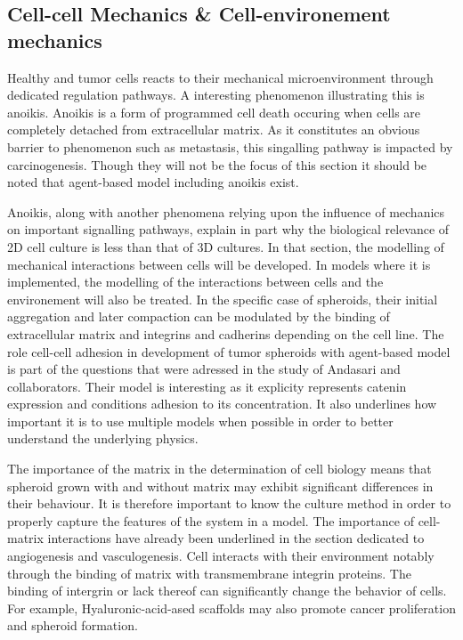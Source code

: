 \documentclass[11pt,a4paper]{article}
\begin{document}
\subsection{Cell-cell Mechanics \& Cell-environement mechanics}
Healthy and tumor cells reacts to their mechanical microenvironment through dedicated regulation pathways. A interesting phenomenon illustrating this is anoikis. Anoikis is a form of programmed cell death occuring when cells are completely detached from extracellular matrix. As it constitutes an obvious barrier to phenomenon such as metastasis, this singalling pathway is impacted by carcinogenesis.\cite{Paoli2013}\cite{Raeisi2022} Though they will not be the focus of this section it should be noted that agent-based model including anoikis exist.\cite{Ingham2017}\cite{Campenni2020}

Anoikis, along with another phenomena relying upon the influence of mechanics on important signalling pathways, explain in part why the biological relevance of 2D cell culture is less than that of 3D cultures. In that section, the modelling of mechanical interactions between cells will be developed. In models where it is implemented, the modelling  of the interactions between cells and the environement will also be treated. In the specific case of spheroids, their initial aggregation and later compaction can be modulated by the binding of extracellular matrix and integrins and cadherins depending on the cell line.\cite{Cui2017} The role cell-cell adhesion in development of tumor spheroids with agent-based model is part of the questions that were  adressed in the study of Andasari and collaborators.\cite{Andasari2012} Their model is interesting as it explicity represents catenin expression and conditions adhesion to its concentration. It also underlines how important it is to use multiple models when possible in order to better understand the underlying physics. 


The importance of the matrix in the determination of cell biology means that spheroid grown with and without matrix may exhibit significant differences in their behaviour. It is therefore important to know the culture method in order to properly capture the features of the system  in a model. The importance of cell-matrix interactions have already been underlined in the section dedicated to angiogenesis and vasculogenesis. Cell interacts with their environment notably through the binding of matrix with transmembrane integrin proteins. The binding of intergrin or lack thereof can significantly change the behavior of cells.\cite{Cui2017} For example, Hyaluronic-acid-ased scaffolds may also promote cancer proliferation and spheroid formation.
\end{document}
